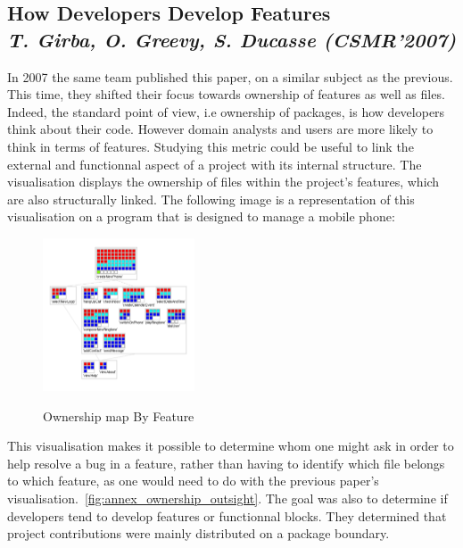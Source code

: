 \subsection{How Developers Develop Features\\ \textit{T. Girba, O. Greevy, S. Ducasse (CSMR'2007)}}

In 2007 the same team published this paper\cite{Girba2007}, on a similar subject as the previous. This time, they shifted their focus towards ownership of features as well as files. Indeed, the standard point of view, i.e ownership of packages, is how developers think about their code. However domain analysts and users are more likely to think in terms of features. Studying this metric could be useful to link the external and functionnal aspect of a project with its internal structure.
The visualisation displays the ownership of files within the project's features, which are also structurally linked. The following image is a representation of this visualisation on a program that is designed to manage a mobile phone:

\begin{figure}[H]
\centering
\includegraphics[width=0.4\textwidth]{./resources/girba2007.png}~
\caption{Ownership map By Feature}
\label{fig:ownership_map_by_feature}
\end{figure}

This visualisation makes it possible to determine whom one might ask in order to help resolve a bug in a feature, rather than having to identify which file belongs to which feature, as one would need to do with the previous paper's visualisation.~\ref{fig:annex_ownership_outsight}.
The goal was also to determine if developers tend to develop features or functionnal blocks. They determined that project contributions were mainly distributed on a package boundary.
